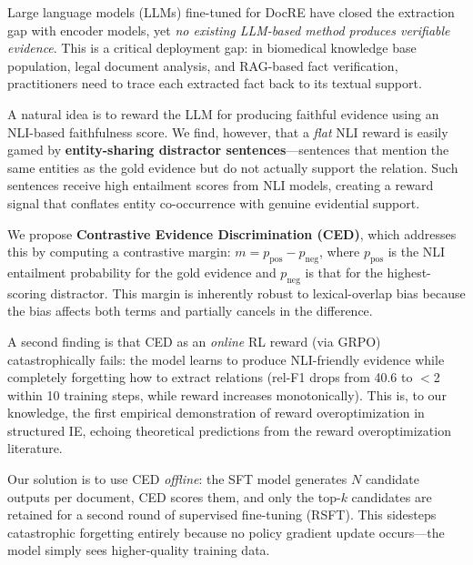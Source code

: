 \documentclass[11pt,a4paper]{article}
\newcommand{\ced}{CED}
\newcommand{\rsft}{RSFT}
\begin{document}
Large language models (LLMs) fine-tuned for DocRE have closed the extraction gap with encoder models, yet \emph{no existing LLM-based method produces verifiable evidence}. This is a critical deployment gap: in biomedical knowledge base population, legal document analysis, and RAG-based fact verification, practitioners need to trace each extracted fact back to its textual support.

A natural idea is to reward the LLM for producing faithful evidence using an NLI-based faithfulness score. We find, however, that a \emph{flat} NLI reward is easily gamed by \textbf{entity-sharing distractor sentences}---sentences that mention the same entities as the gold evidence but do not actually support the relation. Such sentences receive high entailment scores from NLI models, creating a reward signal that conflates entity co-occurrence with genuine evidential support.

We propose \textbf{Contrastive Evidence Discrimination (\ced{})}, which addresses this by computing a contrastive margin: $m = p_\text{pos} - p_\text{neg}$, where $p_\text{pos}$ is the NLI entailment probability for the gold evidence and $p_\text{neg}$ is that for the highest-scoring distractor. This margin is inherently robust to lexical-overlap bias because the bias affects both terms and partially cancels in the difference.

A second finding is that \ced{} as an \emph{online} RL reward (via GRPO) catastrophically fails: the model learns to produce NLI-friendly evidence while completely forgetting how to extract relations (rel-F1 drops from 40.6 to $<$2 within 10 training steps, while reward increases monotonically). This is, to our knowledge, the first empirical demonstration of reward overoptimization in structured IE, echoing theoretical predictions from the reward overoptimization literature.

Our solution is to use \ced{} \emph{offline}: the SFT model generates $N$ candidate outputs per document, \ced{} scores them, and only the top-$k$ candidates are retained for a second round of supervised fine-tuning (\rsft{}). This sidesteps catastrophic forgetting entirely because no policy gradient update occurs---the model simply sees higher-quality training data.
\end{document}
